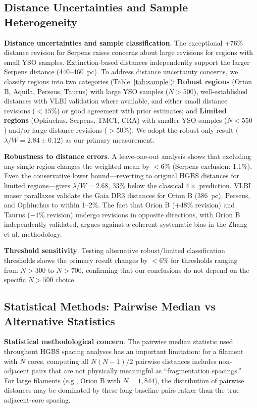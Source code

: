 \documentclass[twocolumn,longtitle,usenatbib]{mnras}
\begin{document}
\subsection{Distance Uncertainties and Sample Heterogeneity}
\label{sec:distance_uncertainties}

\textbf{Distance uncertainties and sample classification}. The exceptional +76\% distance revision for Serpens raises concerns about large revisions for regions with small YSO samples. Extinction-based distances independently support the larger Serpens distance (440--460~pc). To address distance uncertainty concerns, we classify regions into two categories (Table~\ref{tab:sample}): \textbf{Robust regions} (Orion B, Aquila, Perseus, Taurus) with large YSO samples ($N > 500$), well-established distances with VLBI validation where available, and either small distance revisions ($<15$\%) or good agreement with prior estimates; and \textbf{Limited regions} (Ophiuchus, Serpens, TMC1, CRA) with smaller YSO samples ($N < 550$) and/or large distance revisions ($>50$\%). We adopt the robust-only result ($\lambda/W = 2.84 \pm 0.12$) as our primary measurement.

\textbf{Robustness to distance errors}. A leave-one-out analysis shows that excluding any single region changes the weighted mean by $<$6\% (Serpens exclusion: 1.1\%). Even the conservative lower bound—reverting to original HGBS distances for limited regions—gives $\lambda/W = 2.68$, 33\% below the classical $4\times$ prediction. VLBI maser parallaxes validate the Gaia DR3 distances for Orion B (386~pc), Perseus, and Ophiuchus to within 1--2\%. The fact that Orion B ($+$48\% revision) and Taurus ($-$4\% revision) undergo revisions in opposite directions, with Orion B independently validated, argues against a coherent systematic bias in the Zhang et al. methodology.

\textbf{Threshold sensitivity}. Testing alternative robust/limited classification thresholds shows the primary result changes by $<$6\% for thresholds ranging from $N > 300$ to $N > 700$, confirming that our conclusions do not depend on the specific $N > 500$ choice.

\subsection{Statistical Methods: Pairwise Median vs Alternative Statistics}
\label{sec:statistics}

\textbf{Statistical methodological concern}. The pairwise median statistic used throughout HGBS spacing analyses has an important limitation: for a filament with $N$ cores, computing all $N(N-1)/2$ pairwise distances includes non-adjacent pairs that are not physically meaningful as ``fragmentation spacings.'' For large filaments (e.g., Orion B with $N = 1,844$), the distribution of pairwise distances may be dominated by these long-baseline pairs rather than the true adjacent-core spacing.
\end{document}
